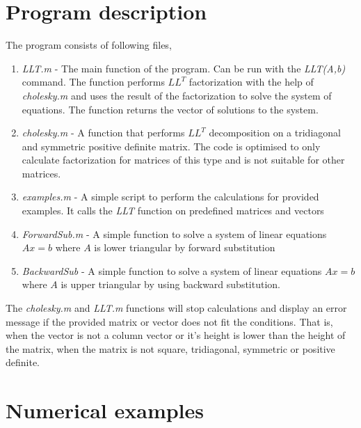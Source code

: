 \documentclass[12pt]{article}
\begin{document}
\section{Program description}
The program consists of following files,
\begin{enumerate}
\item \textit{LLT.m} - The main function of the program. Can be run with the \textit{LLT(A,b)} command. The function performs $LL^T$ factorization with the help of \textit{cholesky.m} and uses the result of the factorization to solve the system of equations. The function returns the vector of solutions to the system.
\item \textit{cholesky.m} - A function that performs $LL^T$ decomposition on a tridiagonal and symmetric positive definite matrix. The code is optimised to only calculate factorization for matrices of this type and is not suitable for other matrices.
\item \textit{examples.m} - A simple script to perform the calculations for provided examples. It calls the \textit{LLT} function on predefined matrices and vectors
\item \textit{ForwardSub.m} - A simple function to solve a system of linear equations $Ax=b$  where $A$ is lower triangular by forward substitution
\item \textit{BackwardSub} - A simple function to solve a system of linear equations $Ax=b$
where $A$ is upper triangular by using backward substitution.
\end{enumerate}
The \textit{cholesky.m} and \textit{LLT.m} functions will stop calculations and display an error message if the provided matrix or vector does not fit the conditions. That is, when the vector is not a column vector or it's height is lower than the height of the matrix, when the matrix is not square, tridiagonal, symmetric or positive definite.

\section{Numerical examples}
\end{document}
